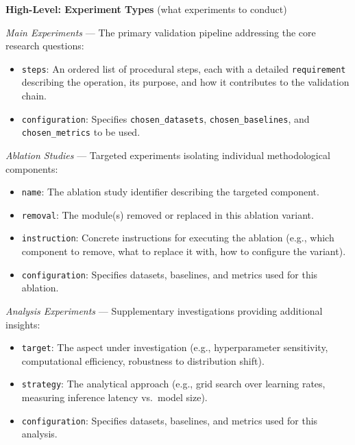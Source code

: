\begin{tcolorbox}[
	title={Box 3: Ground Truth Schema — Hierarchical Experimental Design},
	colback=blue!3!white,
	colframe=blue!30!black,
	colbacktitle=blue!15!white,
	coltitle=black,
	fonttitle=\bfseries,
	arc=3mm,
	boxrule=0.8pt,
	breakable
]
\small
\textbf{High-Level: Experiment Types} (what experiments to conduct)

\medskip
\textit{Main Experiments} — The primary validation pipeline addressing the core research questions:
\begin{itemize}[nosep,leftmargin=12pt]
	\item \texttt{steps}: An ordered list of procedural steps, each with a detailed \texttt{requirement} describing the operation, its purpose, and how it contributes to the validation chain.
	\item \texttt{configuration}: Specifies \texttt{chosen\_datasets}, \texttt{chosen\_baselines}, and \texttt{chosen\_metrics} to be used.
\end{itemize}
\medskip

\textit{Ablation Studies} — Targeted experiments isolating individual methodological components:
\begin{itemize}[nosep,leftmargin=12pt]
	\item \texttt{name}: The ablation study identifier describing the targeted component.
	\item \texttt{removal}: The module(s) removed or replaced in this ablation variant.
	\item \texttt{instruction}: Concrete instructions for executing the ablation (e.g., which component to remove, what to replace it with, how to configure the variant).
	\item \texttt{configuration}: Specifies datasets, baselines, and metrics used for this ablation.
\end{itemize}
\medskip

\textit{Analysis Experiments} — Supplementary investigations providing additional insights:
\begin{itemize}[nosep,leftmargin=12pt]
	\item \texttt{target}: The aspect under investigation (e.g., hyperparameter sensitivity, computational efficiency, robustness to distribution shift).
	\item \texttt{strategy}: The analytical approach (e.g., grid search over learning rates, measuring inference latency vs.\ model size).
	\item \texttt{configuration}: Specifies datasets, baselines, and metrics used for this analysis.
\end{itemize}
\medskip


\end{tcolorbox}
